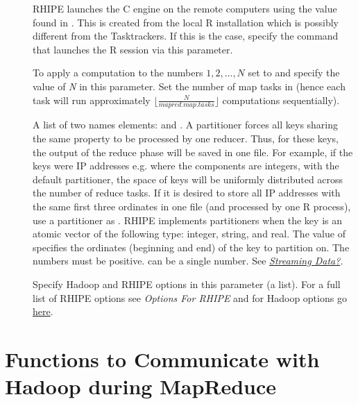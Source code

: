 \documentclass[letterpaper,10pt,english]{sphinxmanual}
\begin{document}
\begin{description}
\item[{}] \leavevmode
RHIPE launches the C engine on the remote computers using the value
found in . This is created from the local R
installation which is possibly different from the Tasktrackers. If this is the
case, specify the command that launches the R session via this parameter.

\item[{}] \leavevmode
To apply a computation to the numbers $1,2,\ldots,N$ set 
to  and specify the value of \emph{N} in this parameter. Set the number
of map tasks in  (hence each task will run approximately
$\lfloor \frac{N}{mapred.map.tasks} \rfloor$ computations sequentially).

\item[{}] \leavevmode
A list of two names elements:  and . A
partitioner forces all keys sharing the same property to be processed by one
reducer. Thus, for these keys, the output of the reduce phase will be saved in
one file. For example, if the keys were IP addresses e.g. 
where the components are integers, with the default partitioner, the space of
keys will be uniformly distributed across the number of reduce tasks. If it is
desired to store all IP addresses with the same first three ordinates in one file (and processed by one R process), use a
partitioner as . RHIPE implements
partitioners when the key is an atomic vector of the following type: integer,
string, and real. The value of  specifies the ordinates (beginning and end) of the key
to partition on. The numbers must be positive.  can be a single number. See {\hyperref[airline:streaming-data]{\emph{Streaming Data?}}}.

\item[{}] \leavevmode
Specify Hadoop and RHIPE options in this parameter (a list). For a full list of
RHIPE options see \emph{Options For RHIPE} and for  Hadoop options go \href{http://hadoop.apache.org/common/docs/current/mapred-default.html}{here}.

\end{description}


\section{Functions to Communicate with Hadoop during MapReduce}
\label{mr:insidemr}\label{mr:functions-to-communicate-with-hadoop-during-mapreduce}
\end{document}
